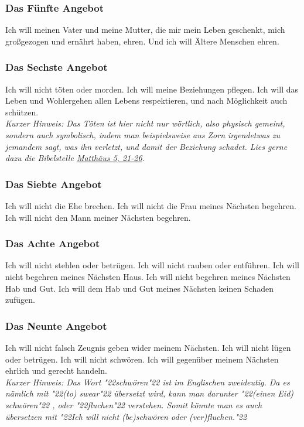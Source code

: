\documentclass[10pt,a5paper]{article}
\newcommand{\q}[1]{\char"22{#1}\char"22 }
\begin{document}
	\subsubsection{Das F\"unfte Angebot}
		Ich will meinen Vater und meine Mutter,
		die mir mein Leben geschenkt,
		mich gro{\ss}gezogen und ern\"ahrt haben,
		ehren.
		Und ich will \"Altere Menschen ehren.
			
	\subsubsection{Das Sechste Angebot} \label{DasSechsteAngebot}
		Ich will nicht t\"oten oder morden.
		Ich will meine Beziehungen pflegen.
		Ich will das Leben und Wohlergehen allen Lebens respektieren,
		und nach M\"oglichkeit auch sch\"utzen.
		\\
		\textit{Kurzer Hinweis:
		Das T\"oten ist hier nicht nur w\"ortlich,
		also physisch gemeint,
		sondern auch symbolisch,
		indem man beispielsweise aus Zorn irgendetwas zu jemandem sagt,
		was ihn verletzt,
		und damit der Beziehung schadet.
		Lies gerne dazu die Bibelstelle \href{https://www.die-bibel.de/bibeln/online-bibeln/lesen/LU17/MAT.5/Matthäus-5}{Matthäus 5, 21-26}.}
		
	\subsubsection{Das Siebte Angebot}
		Ich will nicht die Ehe brechen.
		Ich will nicht die Frau meines N\"achsten begehren.
		Ich will nicht den Mann meiner N\"achsten begehren.
		
	\subsubsection{Das Achte Angebot}
		Ich will nicht stehlen oder betr\"ugen.
		Ich will nicht rauben oder entf\"uhren.
		Ich will nicht begehren meines N\"achsten Haus.
		Ich will nicht begehren meines N\"achsten Hab und Gut.
		Ich will dem Hab und Gut meines N\"achsten keinen Schaden zuf\"ugen.
		
	\subsubsection{Das Neunte Angebot} \label{DasNeunteAngebot}
		Ich will nicht falsch Zeugnis geben wider meinem N\"achsten.
		Ich will nicht l\"ugen oder betr\"ugen.
		Ich will nicht schw\"oren.
		Ich will gegen\"uber meinem N\"achsten ehrlich und gerecht handeln.
		\\
		\textit{Kurzer Hinweis:
		Das Wort \q{schw\"oren} ist im Englischen zweideutig.
		Da es n\"amlich mit \q{(to) swear} \"ubersetzt wird,
		kann man darunter \q{(einen Eid) schw\"oren},
		oder \q{fluchen} verstehen.
		Somit k\"onnte man es auch \"ubersetzen mit
		\q{Ich will nicht (be)schw\"oren oder (ver)fluchen.}}
		
\end{document}
